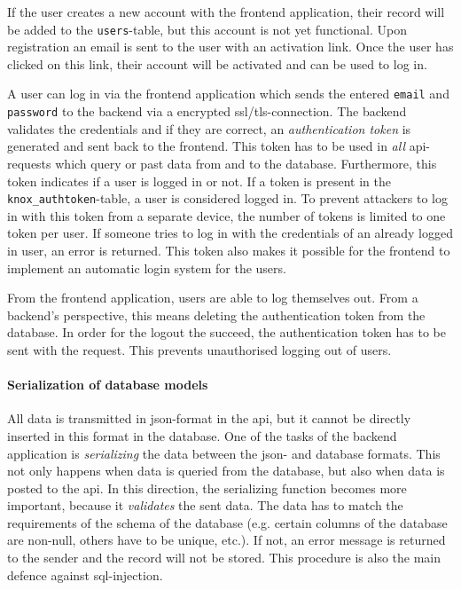 \ind If the user creates a new account with the frontend application, their record will be added to the \texttt{users}-table, but this account is not yet functional. Upon registration an email is sent to the user with an activation link. Once the user has clicked on this link, their account will be activated and can be used to log in.

\ind A user can log in via the frontend application which sends the entered \texttt{email} and \texttt{password} to the backend via a encrypted \ac{ssl}/\ac{tls}-connection. The backend validates the credentials and if they are correct, an \textit{authentication token} is generated and sent back to the frontend. This token has to be used in \textit{all} \ac{api}-requests which query or past data from and to the database. Furthermore, this token indicates if a user is logged in or not. If a token is present in the \verb|knox_authtoken|-table, a user is considered logged in. To prevent attackers to log in with this token from a separate device, the number of tokens is limited to one token per user. If someone tries to log in with the credentials of an already logged in user, an error is returned. This token also makes it possible for the frontend to implement an automatic login system for the users.

\ind From the frontend application, users are able to log themselves out. From a backend's perspective, this means deleting the authentication token from the database. In order for the logout the succeed, the authentication token has to be sent with the request. This prevents unauthorised logging out of users. 

\paragraph{Serialization of database models}\label{sec:backend-serialization}
All data is transmitted in \ac{json}-format in the \ac{api}, but it cannot be directly inserted in this format in the database. One of the tasks of the backend application is \textit{serializing} the data between the \ac{json}- and database formats. This not only happens when data is queried from the database, but also when data is posted to the \ac{api}. In this direction, the serializing function becomes more important, because it \textit{validates} the sent data. The data has to match the requirements of the schema of the database (e.g. certain columns of the database are non-null, others have to be unique, etc.). If not, an error message is returned to the sender and the record will not be stored. This procedure is also the main defence against \ac{sql}-injection.

